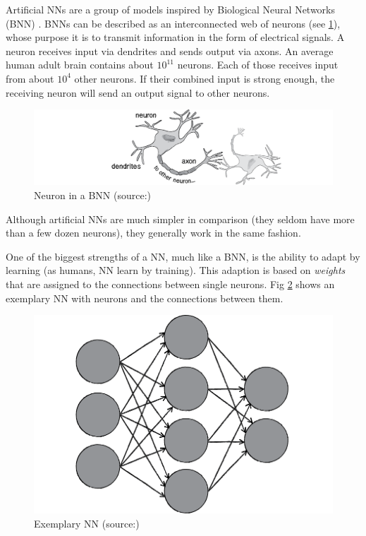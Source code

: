 Artificial NNs are a group of models inspired by Biological Neural Networks (BNN) . BNNs can be described as an interconnected web of neurons (see \ref{fig2_bnn}), whose purpose it is to transmit information in the form of electrical signals. A neuron receives input via dendrites and sends output via axons\cite{Shiffman12}. An average human adult brain contains about $10^{11}$ neurons. Each of those receives input from about $10^4$ other neurons. If their combined input is strong enough, the receiving neuron will send an output signal to other neurons\cite{Bourg04}.

\begin{figure}[H]
	\begin{center}
		\includegraphics[scale=0.7]{img/bnn.png}
		\caption{Neuron in a BNN (source:\cite{Shiffman12})}
		\label{fig2_bnn}
	\end{center}
\end{figure}

Although artificial NNs are much simpler in comparison (they seldom have more than a few dozen neurons\cite{Bourg04}), they generally work in the same fashion.

One of the biggest strengths of a NN, much like a BNN, is the ability to adapt by learning (as humans, NN learn by training\cite{Shiffman12}). This adaption is based on \emph{weights} that are assigned to the connections between single neurons. Fig \ref{fig2_nn} shows an exemplary NN with neurons and the connections between them.

\begin{figure}[H]
	\begin{center}
		\includegraphics[scale=1.0]{img/NN.png}
		\caption{Exemplary NN (source:\cite{Shiffman12})}
		\label{fig2_nn}
	\end{center}
\end{figure}

